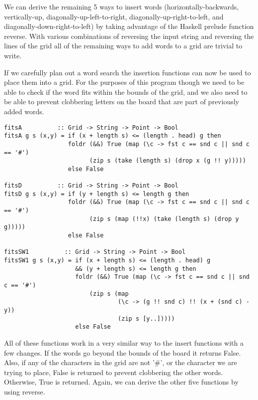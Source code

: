 \documentclass[12pt]{report}   %
\begin{document}
    \vspace{12pt}

    We can derive the remaining 5 ways to insert words (horizontally-backwards,
    vertically-up, diagonally-up-left-to-right, diagonally-up-right-to-left, and
    diagonally-down-right-to-left) by taking advantage of the Haskell prelude
    function reverse. With various combinations of reversing the input string
    and reversing the lines of the grid all of the remaining ways to add words
    to a grid are trivial to write.

    \vspace{12pt}

    If we carefully plan out a word search the insertion functions can now be
    used to place them into a grid. For the purposes of this program though we
    need to be able to check if the word fits within the bounds of the grid,
    and we also need to be able to prevent clobbering letters on the board
    that are part of previously added words.

    \vspace{12pt}

    \begin{lstlisting}
fitsA          :: Grid -> String -> Point -> Bool
fitsA g s (x,y) = if (x + length s) <= (length . head) g then
                  foldr (&&) True (map (\c -> fst c == snd c || snd c == '#') 
                        (zip s (take (length s) (drop x (g !! y)))))
                  else False

fitsD          :: Grid -> String -> Point -> Bool
fitsD g s (x,y) = if (y + length s) <= length g then
                  foldr (&&) True (map (\c -> fst c == snd c || snd c == '#') 
                        (zip s (map (!!x) (take (length s) (drop y g)))))
                  else False

fitsSW1          :: Grid -> String -> Point -> Bool
fitsSW1 g s (x,y) = if (x + length s) <= (length . head) g 
                    && (y + length s) <= length g then 
                    foldr (&&) True (map (\c -> fst c == snd c || snd c == '#') 
                        (zip s (map 
                                (\c -> (g !! snd c) !! (x + (snd c) - y)) 
                                (zip s [y..]))))
                    else False
    \end{lstlisting}

    \vspace{12pt}

    All of these functions work in a very similar way to the insert functions
    with a few changes. If the words go beyond the bounds of the board it
    returns False. Also, if any of the characters in the grid are not '\#', or
    the character we are trying to place, False is returned to prevent
    clobbering the other words. Otherwise, True is returned. Again, we can
    derive the other five functions by using reverse.
\end{document}
